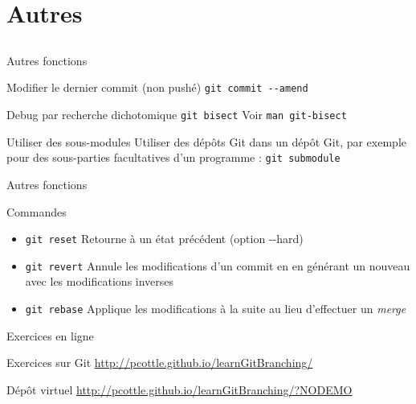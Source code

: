 \documentclass{beamer}
\begin{document}
\section{Autres}
\subsection{}

\begin{frame}[fragile]{Autres fonctions}
  \begin{block}{Modifier le dernier commit (non pushé)}
    \textcolor{commandcolor}{\verb?git commit --amend?}
  \end{block}
  \begin{block}{Debug par recherche dichotomique}
    \textcolor{commandcolor}{\verb?git bisect?}\newline
    Voir \textcolor{commandcolor}{\verb?man git-bisect?}
  \end{block}
  \begin{block}{Utiliser des sous-modules}
    Utiliser des dépôts Git dans un dépôt Git, par exemple pour des sous-parties facultatives d'un programme :\linebreak
    \textcolor{commandcolor}{\verb?git submodule?}
  \end{block}
\end{frame}

\begin{frame}[fragile]{Autres fonctions}
  \begin{block}{Commandes}
    \begin{itemize}
    \item \textcolor{commandcolor}{\verb?git reset?}\linebreak
      Retourne à un état précédent (option -{}-hard)
    \item \textcolor{commandcolor}{\verb?git revert?}\linebreak
      Annule les modifications d'un commit en en générant un nouveau avec les modifications inverses
    \item \textcolor{commandcolor}{\verb?git rebase?}\linebreak
      Applique les modifications à la suite au lieu d'effectuer un \textit{merge}
    \end{itemize}
  \end{block}
\end{frame}

\begin{frame}[fragile]{Exercices en ligne}
  \begin{exampleblock}{Exercices sur Git}
    \url{http://pcottle.github.io/learnGitBranching/}
  \end{exampleblock}
  \begin{block}{Dép\^ot virtuel}
    \url{http://pcottle.github.io/learnGitBranching/?NODEMO}
  \end{block}
\end{frame}
\end{document}
